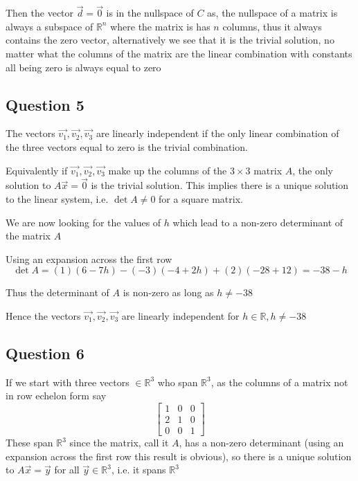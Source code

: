 \documentclass{article}
\begin{document}
\begin{enumerate}[(a)]
    Then the vector \(\vec{d} = \vec{0}\) is in the nullspace of \(C\) as, the nullspace of a matrix is always a subspace of 
    \(\mathbb{R}^n\) where the matrix is has \(n\) columns, thus it always contains the zero vector, alternatively
    we see that it is the trivial solution, no matter what the columns of the matrix are the linear combination with 
    constants all being zero is always equal to zero 
\end{enumerate}

\subsection*{Question 5}
The vectors \(\vec{v_1}, \vec{v_2}, \vec{v_3}\) are linearly independent if the only linear combination of the three
vectors equal to zero is the trivial combination. 

Equivalently if \(\vec{v_1}, \vec{v_2}, \vec{v_3}\) make up the columns of the \(3\times 3\) matrix \(A\), the only solution to 
\(A\vec{x} = \vec{0}\) is the trivial solution. This implies there is a unique solution to the linear system, i.e. \(\det{A} \neq 0\) 
for a square matrix.

We are now looking for the values of \(h\) which lead to a non-zero determinant of the matrix \(A\)

Using an expansion across the first row
\[
\det{A} = (1)(6-7h) - (-3)(-4+2h) + (2)(-28+12) = -38 -h
\]

Thus the determinant of \(A\) is non-zero as long as \(h \neq -38\)

Hence the vectors \(\vec{v_1}, \vec{v_2}, \vec{v_3}\) are linearly independent for \(h \in \mathbb{R}, h \neq -38\)


\subsection*{Question 6}
If we start with three vectors \(\in \mathbb{R}^3\) who span \(\mathbb{R}^3\), as the columns of a matrix not in row echelon form
say 
\[
\begin{bmatrix}
    1&0&0 \\
    2&1&0 \\
    0&0&1
\end{bmatrix}
\]
These span \(\mathbb{R}^3\) since the matrix, call it \(A\), has a non-zero determinant (using an expansion across the first row this result is obvious), 
so there is a unique solution to 
\(A\vec{x} = \vec{y}\) for all \(\vec{y} \in \mathbb{R}^3\), i.e. it spans \(\mathbb{R}^3\)
\\
\end{document}
